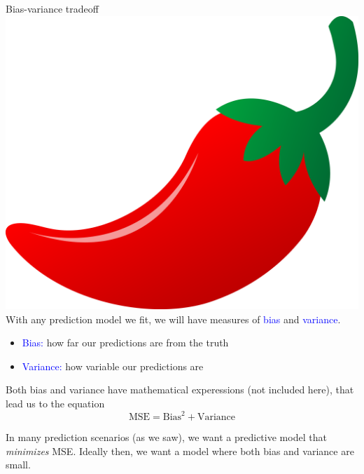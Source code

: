\documentclass[10pt,t]{beamer}
\begin{document}
\begin{frame}{Bias-variance tradeoff \includegraphics[scale=0.01]{chilipepper.png}}
With any prediction model we fit, we will have measures of \textcolor{blue}{bias} and \textcolor{blue}{variance}.

\vspace{0.3cm}

\begin{itemize}
	\item \textcolor{blue}{Bias:} how far our predictions are from the truth
	\item \textcolor{blue}{Variance:} how variable our predictions are
\end{itemize}

\vspace{0.3cm} 

Both bias and variance have mathematical experessions (not included here), that lead us to the equation
$$
\text{MSE} = \text{Bias}^2 + \text{Variance}
$$ \pause

In many prediction scenarios (as we saw), we want a predictive model that \textit{minimizes} MSE. Ideally then, we want a model where both bias and variance are small. 
\end{frame}
\end{document}
